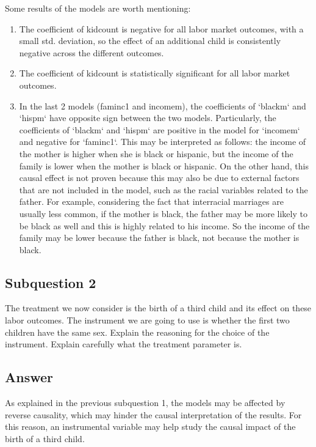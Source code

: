 \documentclass{article}
\begin{document}
	Some results of the models are worth mentioning:
	\begin{enumerate}
		\item The coefficient of kidcount is negative for all labor market outcomes, with a small std. deviation, so the effect of an additional child is consistently negative across the different outcomes.
		\item The coefficient of kidcount is statistically significant for all labor market outcomes.
		\item In the last 2 models (faminc1 and incomem), the coefficients of `blackm` and `hispm` have opposite sign between the two models. Particularly, the	coefficients of `blackm` and `hispm` are positive in the model for `incomem` and negative for `faminc1`. This may be interpreted as follows: the income of the mother is higher when she is black or hispanic, but the income of the family is lower when the mother is black or hispanic.
		On the other hand, this causal effect is not proven because this may also be due to external factors that are not included in the model, such as the	racial variables related to the father.
		For example, considering the fact that interracial marriages are usually less common, if the mother is black, the father may be more likely to be black as well and this is highly related to his income. So the income of the family may be lower because the father is black, not because the mother is black.
	\end{enumerate}
		
	
	\subsection{Subquestion 2}
	
	The treatment we now consider is the birth of a third child and its effect on these labor outcomes. The instrument we are going to use is whether the first two children have the same sex. Explain the reasoning
	for the choice of the instrument. Explain carefully what the treatment parameter is.
	\subsection{Answer}
	As explained in the previous subquestion 1, the models may be affected by reverse causality, which may hinder the causal interpretation of the results. 
	For this reason, an instrumental variable may help study the causal impact of the birth of a third child. 
		
\end{document}

